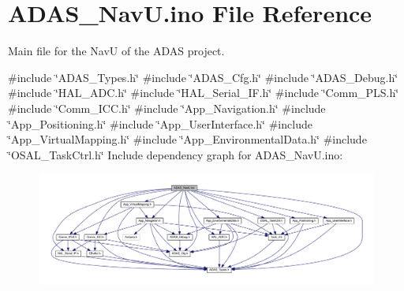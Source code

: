 \hypertarget{_a_d_a_s___nav_u_8ino}{}\section{A\+D\+A\+S\+\_\+\+Nav\+U.\+ino File Reference}
\label{_a_d_a_s___nav_u_8ino}


Main file for the NavU of the A\+D\+AS project.  


{\ttfamily \#include \char`\"{}A\+D\+A\+S\+\_\+\+Types.\+h\char`\"{}}\newline
{\ttfamily \#include \char`\"{}A\+D\+A\+S\+\_\+\+Cfg.\+h\char`\"{}}\newline
{\ttfamily \#include \char`\"{}A\+D\+A\+S\+\_\+\+Debug.\+h\char`\"{}}\newline
{\ttfamily \#include \char`\"{}H\+A\+L\+\_\+\+A\+D\+C.\+h\char`\"{}}\newline
{\ttfamily \#include \char`\"{}H\+A\+L\+\_\+\+Serial\+\_\+\+I\+F.\+h\char`\"{}}\newline
{\ttfamily \#include \char`\"{}Comm\+\_\+\+P\+L\+S.\+h\char`\"{}}\newline
{\ttfamily \#include \char`\"{}Comm\+\_\+\+I\+C\+C.\+h\char`\"{}}\newline
{\ttfamily \#include \char`\"{}App\+\_\+\+Navigation.\+h\char`\"{}}\newline
{\ttfamily \#include \char`\"{}App\+\_\+\+Positioning.\+h\char`\"{}}\newline
{\ttfamily \#include \char`\"{}App\+\_\+\+User\+Interface.\+h\char`\"{}}\newline
{\ttfamily \#include \char`\"{}App\+\_\+\+Virtual\+Mapping.\+h\char`\"{}}\newline
{\ttfamily \#include \char`\"{}App\+\_\+\+Environmental\+Data.\+h\char`\"{}}\newline
{\ttfamily \#include \char`\"{}O\+S\+A\+L\+\_\+\+Task\+Ctrl.\+h\char`\"{}}\newline
Include dependency graph for A\+D\+A\+S\+\_\+\+Nav\+U.\+ino\+:
\nopagebreak
\begin{figure}[H]
\begin{center}
\leavevmode
\includegraphics[width=350pt]{_a_d_a_s___nav_u_8ino__incl}
\end{center}
\end{figure}
